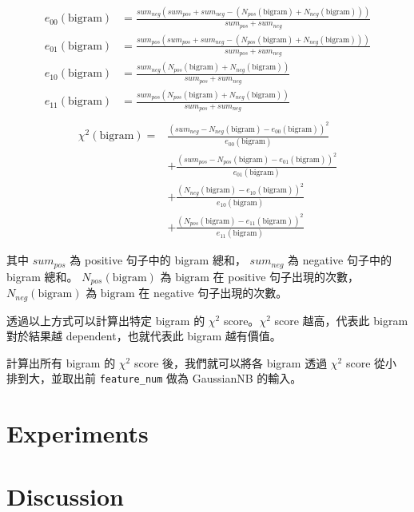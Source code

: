\documentclass{article}[12pt]
\begin{document}
\begin{align*}
    e_{00}(\text{bigram}) &= \frac{sum_{neg}(sum_{pos}+sum_{neg}-(N_{pos}(\text{bigram})+N_{neg}(\text{bigram})))}{sum_{pos}+sum_{neg}} \\
    e_{01}(\text{bigram}) &= \frac{sum_{pos}(sum_{pos}+sum_{neg}-(N_{pos}(\text{bigram})+N_{neg}(\text{bigram})))}{sum_{pos}+sum_{neg}} \\
    e_{10}(\text{bigram}) &= \frac{sum_{neg}(N_{pos}(\text{bigram})+N_{neg}(\text{bigram}))}{sum_{pos}+sum_{neg}} \\
    e_{11}(\text{bigram}) &= \frac{sum_{pos}(N_{pos}(\text{bigram})+N_{neg}(\text{bigram}))}{sum_{pos}+sum_{neg}} \\
\end{align*}
\begin{equation}
    \begin{aligned}
        \chi^2(\text{bigram}) = &\frac{(sum_{neg} - N_{neg}(\text{bigram}) - e_{00}(\text{bigram}))^2}{e_{00}(\text{bigram})} \\
        &+ \frac{(sum_{pos} - N_{pos}(\text{bigram}) - e_{01}(\text{bigram}))^2}{e_{01}(\text{bigram})} \\
        &+ \frac{(N_{neg}(\text{bigram}) - e_{10}(\text{bigram}))^2}{e_{10}(\text{bigram})} \\
        &+ \frac{(N_{pos}(\text{bigram}) - e_{11}(\text{bigram}))^2}{e_{11}(\text{bigram})}
    \end{aligned}    
\end{equation}

其中 $sum_{pos}$ 為 positive 句子中的 bigram 總和，
$sum_{neg}$ 為 negative 句子中的 bigram 總和。
$N_{pos}(\text{bigram})$ 為 $\text{bigram}$ 在 positive 句子出現的次數，
$N_{neg}(\text{bigram})$ 為 $\text{bigram}$ 在 negative 句子出現的次數。

透過以上方式可以計算出特定 bigram 的 $\chi^2$ score。$\chi^2$ score 越高，代表此 bigram
對於結果越 dependent，也就代表此 bigram 越有價值。

計算出所有 bigram 的 $\chi^2$ score 後，我們就可以將各 bigram 透過 $\chi^2$ score 從小
排到大，並取出前 \texttt{feature\_num} 做為 GaussianNB 的輸入。

\section{Experiments}



\section{Discussion}
\subsection{}
\end{document}
